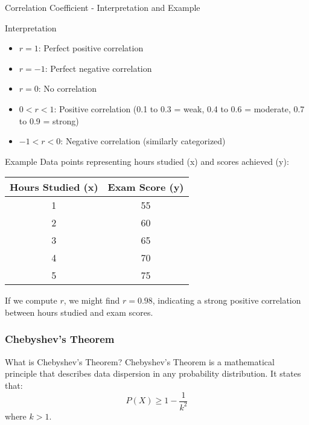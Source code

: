 \documentclass[aspectratio=169]{beamer}
\begin{document}
\begin{frame}[fragile]{Correlation Coefficient - Interpretation and Example}
    \begin{block}{Interpretation}
        \begin{itemize}
            \item \( r = 1 \): Perfect positive correlation
            \item \( r = -1 \): Perfect negative correlation
            \item \( r = 0 \): No correlation
            \item \( 0 < r < 1 \): Positive correlation (0.1 to 0.3 = weak, 0.4 to 0.6 = moderate, 0.7 to 0.9 = strong)
            \item \( -1 < r < 0 \): Negative correlation (similarly categorized)
        \end{itemize}
    \end{block}
    
    \begin{block}{Example}
        Data points representing hours studied (x) and scores achieved (y):
        \begin{center}
        \begin{tabular}{|c|c|}
            \hline
            Hours Studied (x) & Exam Score (y) \\
            \hline
            1 & 55 \\
            2 & 60 \\
            3 & 65 \\
            4 & 70 \\
            5 & 75 \\
            \hline
        \end{tabular}
        \end{center}
        If we compute \( r \), we might find \( r = 0.98 \), indicating a strong positive correlation between hours studied and exam scores.
    \end{block}
\end{frame}

\begin{frame}[fragile]
    \frametitle{Chebyshev's Theorem}
    \begin{block}{What is Chebyshev's Theorem?}
        Chebyshev's Theorem is a mathematical principle that describes data dispersion in any probability distribution. It states that:
        \[
        P(X) \geq 1 - \frac{1}{k^2}
        \]
        where \( k > 1 \).
    \end{block}
\end{frame}
\end{document}
